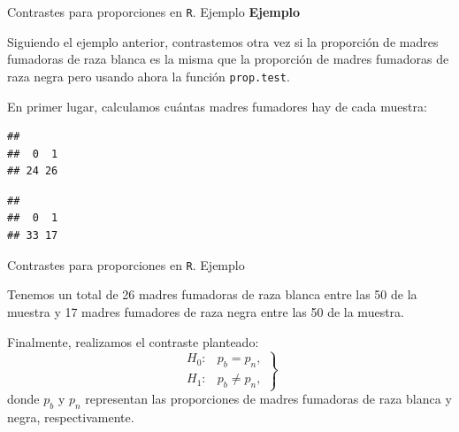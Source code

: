 \documentclass[
  ignorenonframetext,
]{beamer}
\newenvironment{Shaded}{\begin{snugshade}}{\end{snugshade}}
\newcommand{\CommentTok}[1]{\textcolor[rgb]{0.56,0.35,0.01}{\textit{#1}}}
\newcommand{\DecValTok}[1]{\textcolor[rgb]{0.00,0.00,0.81}{#1}}
\newcommand{\KeywordTok}[1]{\textcolor[rgb]{0.13,0.29,0.53}{\textbf{#1}}}
\newcommand{\NormalTok}[1]{#1}
\newcommand{\OperatorTok}[1]{\textcolor[rgb]{0.81,0.36,0.00}{\textbf{#1}}}
\newcommand{\StringTok}[1]{\textcolor[rgb]{0.31,0.60,0.02}{#1}}
\begin{document}
\begin{frame}[fragile]{Contrastes para proporciones en \texttt{R}.
Ejemplo}
\protect\hypertarget{contrastes-para-proporciones-en-r.-ejemplo}{}
\textbf{Ejemplo}

Siguiendo el ejemplo anterior, contrastemos otra vez si la proporción de
madres fumadoras de raza blanca es la misma que la proporción de madres
fumadoras de raza negra pero usando ahora la función \texttt{prop.test}.

En primer lugar, calculamos cuántas madres fumadores hay de cada
muestra:

\begin{Shaded}
\end{Shaded}

\begin{verbatim}
## 
##  0  1 
## 24 26
\end{verbatim}

\begin{Shaded}
\end{Shaded}

\begin{verbatim}
## 
##  0  1 
## 33 17
\end{verbatim}
\end{frame}

\begin{frame}[fragile]{Contrastes para proporciones en \texttt{R}.
Ejemplo}
\protect\hypertarget{contrastes-para-proporciones-en-r.-ejemplo-1}{}
\begin{Shaded}
\end{Shaded}

Tenemos un total de 26 madres fumadoras de raza blanca entre las 50 de
la muestra y 17 madres fumadores de raza negra entre las 50 de la
muestra.

Finalmente, realizamos el contraste planteado: \[
\left.
\begin{array}{ll}
H_0: & p_b = p_n, \\
H_1: & p_b \neq p_n,
\end{array}
\right\}
\] donde \(p_b\) y \(p_n\) representan las proporciones de madres
fumadoras de raza blanca y negra, respectivamente.
\end{frame}
\end{document}
